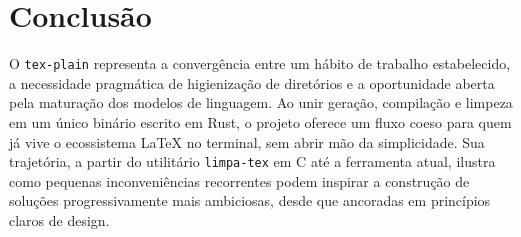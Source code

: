 \documentclass[11pt,a4paper]{article}
\begin{document}
\section{Conclusão}

O \texttt{tex-plain} representa a convergência entre um hábito de trabalho estabelecido, a necessidade pragmática de higienização de diretórios e a oportunidade aberta pela maturação dos modelos de linguagem. Ao unir geração, compilação e limpeza em um único binário escrito em Rust, o projeto oferece um fluxo coeso para quem já vive o ecossistema LaTeX no terminal, sem abrir mão da simplicidade. Sua trajetória, a partir do utilitário \texttt{limpa-tex} em C até a ferramenta atual, ilustra como pequenas inconveniências recorrentes podem inspirar a construção de soluções progressivamente mais ambiciosas, desde que ancoradas em princípios claros de design.
\end{document}
